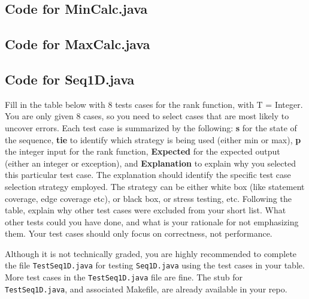 \documentclass[12pt,fleqn]{examtst}
\begin{document}
\noindent 

\newpage

\subsection*{Code for MinCalc.java}

\noindent 

\newpage

\subsection*{Code for MaxCalc.java}

\noindent 

\newpage

\subsection*{Code for Seq1D.java}

\noindent 

\newpage


 \label{Q_TestTable}

Fill in the table below with 8 tests cases for the rank function, with T =
Integer.  You are only given 8 cases, so you need to select cases that are most
likely to uncover errors.  Each test case is summarized by the following:
\textbf{s} for the state of the sequence, \textbf{tie} to identify which
strategy is being used (either min or max), \textbf{p} the integer input for the
rank function, \textbf{Expected} for the expected output (either an integer or
exception), and \textbf{Explanation} to explain why you selected this particular
test case.  The explanation should identify the specific test case selection
strategy employed.  The strategy can be either white box (like statement
coverage, edge coverage etc), or black box, or stress testing, etc.  Following
the table, explain why other test cases were excluded from your short list.  What
other tests could you have done, and what is your rationale for not emphasizing
them.  Your test cases should only focus on correctness, not performance.

Although it is not technically graded, you are highly recommended to complete
the file \texttt{TestSeq1D.java} for testing \texttt{Seq1D.java} using the test
cases in your table.  More test cases in the \texttt{TestSeq1D.java} file are
fine.  The stub for \texttt{TestSeq1D.java}, and associated Makefile, are already available in
your repo.\\
\end{document}
